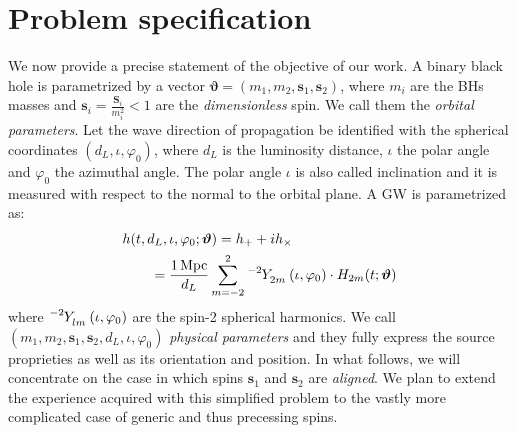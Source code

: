 \section{Problem specification}
\label{sec:setup}
We now provide a precise statement of the objective of our work.
A binary black hole is parametrized by a vector $ \boldsymbol{\vartheta} = (m_1,m_2, \mathbf{s}_1,\mathbf{s}_2) $, where $m_i$ are the BHs masses and $\mathbf{s}_i = \frac{\mathbf{S}_i}{m_i^2} <1$ are the \textit{dimensionless} spin. 
We call them the \textit{orbital parameters}.
Let the wave direction of propagation be identified with the spherical coordinates $(d_L, \iota, \varphi_0)$, where $d_L$ is the luminosity distance, $\iota$ the polar angle and $\varphi_0$ the azimuthal angle. The polar angle $\iota$ is also called inclination and it is measured with respect to the normal to the orbital plane.
A GW is parametrized as:
\begin{align} \label{eq:h_parametrization}
	&h(t, d_L,\iota,\varphi_0; \boldsymbol{\vartheta}) = h_+ + i h_\times \nonumber \\
		&\qquad= {\frac{\SI{1}{Mpc}}{d_L}} \sum_{m = -2}^{2} \tensor[^{-2}]{Y}{_{2 m}}(\iota, \varphi_0) \cdot H_{2m}(t; \boldsymbol{\vartheta})
\end{align}
where $\tensor[^{-2}]{Y}{_{l m}}(\iota, \varphi_0)$ are the spin-2 spherical harmonics.
We call $(m_1,m_2, \mathbf{s}_1,\mathbf{s}_2, d_L,\iota,\varphi_0)$ \textit{physical parameters} and they fully express the source proprieties as well as its orientation and position.
In what follows, we will concentrate on the case in which spins $\mathbf{s}_1$ and $\mathbf{s}_2$ are \textit{aligned}. We plan to extend the experience acquired with this simplified problem to the vastly more complicated case of generic and thus precessing spins.

